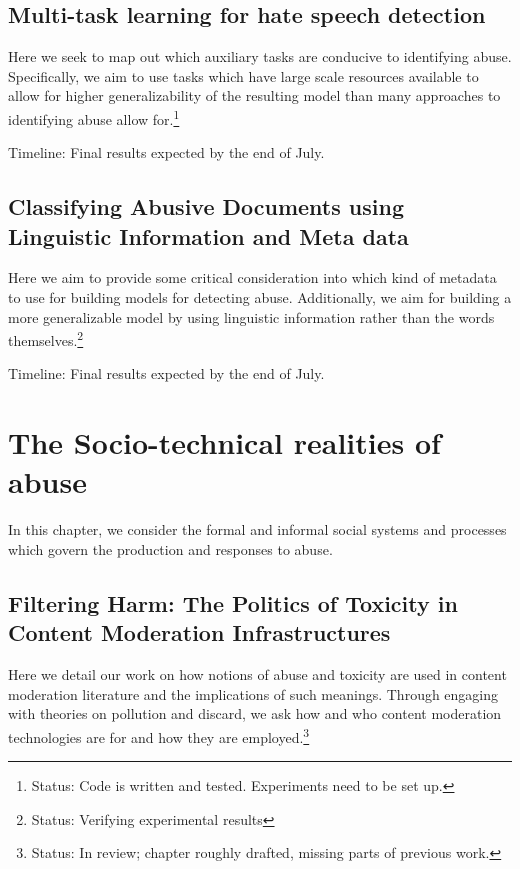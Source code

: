 {\subsection{Multi-task learning for hate speech detection}
Here we seek to map out which auxiliary tasks are conducive to identifying abuse. Specifically, we aim to use tasks which have large scale resources available to allow for higher generalizability of the resulting model than many approaches to identifying abuse allow for.\footnote{Status: Code is written and tested. Experiments need to be set up.}

Timeline: Final results expected by the end of July.

\subsection{Classifying Abusive Documents using Linguistic Information and Meta data}
Here we aim to provide some critical consideration into which kind of metadata to use for building models for detecting abuse. Additionally, we aim for building a more generalizable model by using linguistic information rather than the words themselves.\footnote{Status: Verifying experimental results}

Timeline: Final results expected by the end of July.

\section{The Socio-technical realities of abuse}

In this chapter, we consider the formal and informal social systems and processes which govern the production and responses to abuse.

\subsection{Filtering Harm: The Politics of Toxicity in Content Moderation Infrastructures}
Here we detail our work on how notions of abuse and toxicity are used in content moderation literature and the implications of such meanings. Through engaging with theories on pollution and discard, we ask how and who content moderation technologies are for and how they are employed.\footnote{Status: In review; chapter roughly drafted, missing parts of previous work.}

}
